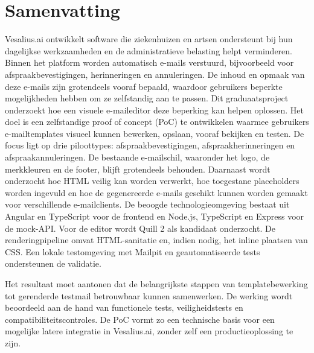 
\chapter*{Samenvatting}
\label{ch:samenvatting-nl}
Vesalius.ai ontwikkelt software die ziekenhuizen en artsen ondersteunt bij hun dagelijkse werkzaamheden en de administratieve belasting helpt verminderen. 
Binnen het platform worden automatisch e-mails verstuurd, bijvoorbeeld voor afspraakbevestigingen, herinneringen en annuleringen. 
De inhoud en opmaak van deze e-mails zijn grotendeels vooraf bepaald, waardoor gebruikers beperkte mogelijkheden hebben om ze zelfstandig aan te passen. 
Dit graduaatsproject onderzoekt hoe een visuele e-maileditor deze beperking kan helpen oplossen.
Het doel is een zelfstandige proof of concept (PoC) te ontwikkelen waarmee gebruikers e-mailtemplates visueel kunnen bewerken, opslaan, vooraf bekijken en testen. 
De focus ligt op drie piloottypes: afspraakbevestigingen, afspraakherinneringen en afspraakannuleringen. 
De bestaande e-mailschil, waaronder het logo, de merkkleuren en de footer, blijft grotendeels behouden. 
Daarnaast wordt onderzocht hoe HTML veilig kan worden verwerkt, hoe toegestane placeholders worden ingevuld en hoe de gegenereerde e-mails geschikt kunnen worden gemaakt voor verschillende e-mailclients.
De beoogde technologieomgeving bestaat uit Angular en TypeScript voor de frontend en Node.js, TypeScript en Express voor de mock-API. 
Voor de editor wordt Quill 2 als kandidaat onderzocht. 
De renderingpipeline omvat HTML-sanitatie en, indien nodig, het inline plaatsen van CSS. Een lokale testomgeving met Mailpit en geautomatiseerde tests ondersteunen de validatie.

Het resultaat moet aantonen dat de belangrijkste stappen van templatebewerking tot gerenderde testmail betrouwbaar kunnen samenwerken. 
De werking wordt beoordeeld aan de hand van functionele tests, veiligheidstests en compatibiliteitscontroles. 
De PoC vormt zo een technische basis voor een mogelijke latere integratie in Vesalius.ai, zonder zelf een productieoplossing te zijn.

